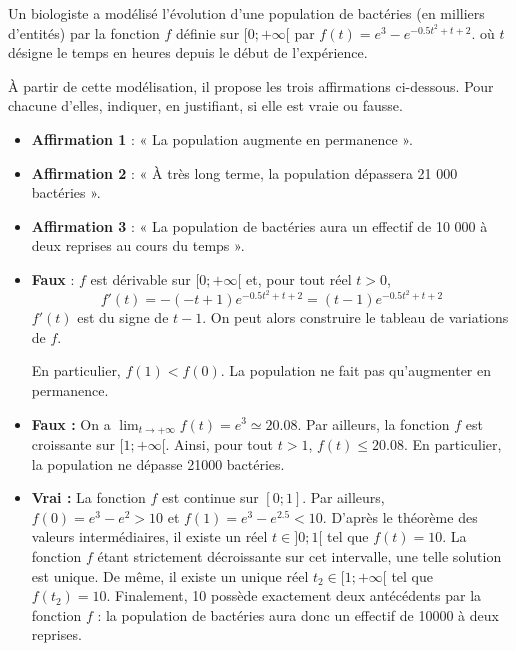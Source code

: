 \documentclass[11pt,fleqn, openany]{book} %
\begin{document}
\begin{exercise}[topic=cont03, subtitle={(Centres étrangers 2023)}]
Un biologiste a modélisé l'évolution d'une population de bactéries (en milliers d'entités) par la fonction $f$ définie sur $[0;+\infty[$ par $f(t)=e^3-e^{-0.5t^2+t+2}$. où $t$ désigne le temps en heures depuis le début de l'expérience.

À partir de cette modélisation, il propose les trois affirmations ci-dessous. Pour chacune d'elles, indiquer, en justifiant, si elle est vraie ou fausse.
\begin{itemize}
\item \textbf{Affirmation 1} : « La population augmente en permanence ».
\item \textbf{Affirmation 2} : « À très long terme, la population dépassera 21 000 bactéries ».
\item \textbf{Affirmation 3} : « La population de bactéries aura un effectif de 10 000 à deux reprises au cours du temps ».\end{itemize}
\end{exercise}

\begin{solution}\hspace{0pt}

\begin{itemize}
\item  \textbf{Faux} : $f$ est dérivable sur $[0;+\infty[$ et, pour tout réel $t>0$, \[f'(t)=-(-t+1)e^{-0.5t^2+t+2}=(t-1)e^{-0.5t^2+t+2}\] $f'(t)$ est du signe de $t-1$. On peut alors construire le tableau de variations de $f$.

\begin{center}
\end{center}

En particulier, $f(1)<f(0)$. La population ne fait pas qu'augmenter en permanence.
\item \textbf{Faux :}  On a $\displaystyle\lim_{t\to+\infty}f(t)=e^3 \simeq 20.08$. Par ailleurs, la fonction $f$ est croissante sur $[1;+\infty[$. Ainsi, pour tout $t>1$, $f(t)\leqslant 20.08$. En particulier, la population ne dépasse 21000 bactéries.

\item \textbf{Vrai : } La fonction $f$ est continue sur $[0;1]$. Par ailleurs, $f(0)=e^3-e^2 >10$ et $f(1)=e^3-e^{2.5}<10$. D'après le théorème des valeurs intermédiaires, il existe un réel $t\in ]0;1[$ tel que $f(t)=10$. La fonction $f$ étant strictement décroissante sur cet intervalle, une telle solution est unique. De même, il existe un unique réel $t_2 \in [1;+\infty[$ tel que $f(t_2)=10$. Finalement, 10 possède exactement deux antécédents par la fonction $f$ : la population de bactéries aura donc un effectif de 10000 à deux reprises.\end{itemize}

\end{solution}
\end{document}
